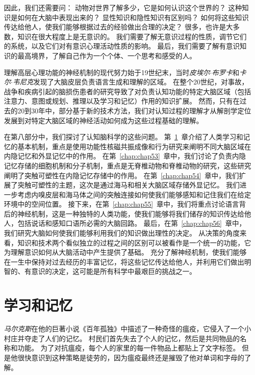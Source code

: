 因此，我们还需要问：
动物对世界了解多少，它是如何认识这个世界的？
这种知识是如何在大脑中表现出来的？
显性知识和隐性知识有区别吗？
如何将这些知识传达给他人，使我们能够根据过去的经验做出合理的决定？
很多，也许是大多数，知识在很大程度上是无意识的。
我们需要了解无意识过程的性质，调节它们的系统，以及它们对有意识心理活动性质的影响。
最后，我们需要了解有意识知识的最高境界，了解自己作为一个个体、一个思考和感受的人。


理解高层心理功能的神经机制的现代努力始于19世纪末，当时\textit{皮埃尔$\cdot$布罗卡}和\textit{卡尔$\cdot$韦尼克}发现了大脑皮层负责语言生成和理解的区域。
在整个20世纪，对事故，战争和疾病引起的脑损伤患者的研究导致了对负责认知功能的特定大脑区域（包括注意力、意图或规划、推理以及学习和记忆）作用的知识扩展。
然而，只有在过去的20到30年中，部分基于新的技术方法，我们对认知过程的理解才从解剖学定位发展到对特定大脑区域的神经活动如何成为这些过程基础的理解。


在第八部分中，我们探讨了认知脑科学的这些问题。
第~\ref{chap:chap52}~章介绍了人类学习和记忆的基本机制，重点是使用功能性核磁共振成像和行为研究来阐明不同大脑区域在内隐记忆和外显记忆中的作用。
在第~\ref{chap:chap53}~章中，我们讨论了负责内隐记忆存储的细胞机制和分子机制，重点是无脊椎动物和脊椎动物的研究，这些研究阐明了突触可塑性在内隐记忆存储中的作用。
在第~\ref{chap:chap54}~章中，我们扩展了突触可塑性的主题，这次是通过海马和相关大脑区域存储外显记忆。
我们进一步考虑内嗅皮层和海马体之间的突触连接如何使我们能够感知和记住我们在给定环境中的空间位置。
接下来，在第~\ref{chap:chap55}~章中，我们将重点讨论语言背后的神经机制，这是一种独特的人类功能，使我们能够将我们储存的知识传达给他人，包括说话和感知口语所必需的大脑回路。
最后，在第~\ref{chap:chap56}~章中，我们研究大脑如何使我们能够利用我们的知识做出理性的决定。
从决策的角度来看，知识和技术两个看似独立的过程之间的区别可以被看作是一个统一的功能，它为理解意识如何从大脑活动中产生提供了基础。
充分了解神经机制，使我们能够在一生中保持对过去经历的丰富记忆，将这些记忆传达给他人，并利用它们做出明智的、有意识的决定，这可能是所有科学中最艰巨的挑战之一。



\chapter{学习和记忆} \label{chap:chap52}

\textit{马尔克斯}在他的巨著小说《百年孤独》中描述了一种奇怪的瘟疫，它侵入了一个小村庄并夺走了人们的记忆。
村民们首先失去了个人的记忆，然后是共同物品的名称和功能。
为了对抗瘟疫，每个人的家里的每一件物品上都贴上了文字标签。
但是他很快意识到这种策略是徒劳的，因为瘟疫最终还是摧毁了他对单词和字母的了解。



